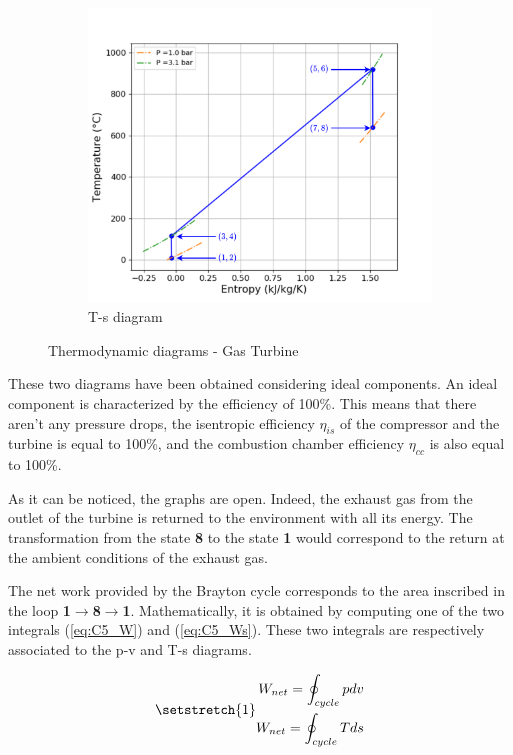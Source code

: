\begin{figure}[H]
\begin{subfigure}[b]{0.4\textwidth}
         \includegraphics[width=\textwidth]{Ts_GT}
         \caption{T-s diagram}
         \label{fig:C5_Ts_GT}
     \end{subfigure}
        \caption{Thermodynamic diagrams - Gas Turbine}
        \label{fig:C5_thermo_diagram_GT}
\end{figure}

These two diagrams have been obtained considering ideal components. An ideal component is characterized by the efficiency of 100\%. This means that there aren't any pressure drops, the isentropic efficiency $\eta_{is}$ of the compressor and the turbine is equal to 100\%, and the combustion chamber efficiency $\eta_{cc}$ is also equal to 100\%.

As it can be noticed, the graphs are open. Indeed, the exhaust gas from the outlet of the turbine is returned to the environment with all its energy. The transformation from the state \textbf{8} to the state \textbf{1} would correspond to the return at the ambient conditions of the exhaust gas. 

The net work provided by the Brayton cycle corresponds to the area inscribed in the loop \textbf{1}$\rightarrow$\textbf{8}$\rightarrow$\textbf{1}. Mathematically, it is obtained by computing one of the two integrals (\ref{eq:C5_W}) and (\ref{eq:C5_Ws}). These two integrals are respectively associated to the p-v and T-s diagrams.

\begin{subequations}  
\setstretch{1}
\begin{align}
    W_{net} = \oint_{cycle}pdv\label{eq:C5_W}\\
    W_{net} = \oint_{cycle}Tds\label{eq:C5_Ws}
\end{align}
\end{subequations}

